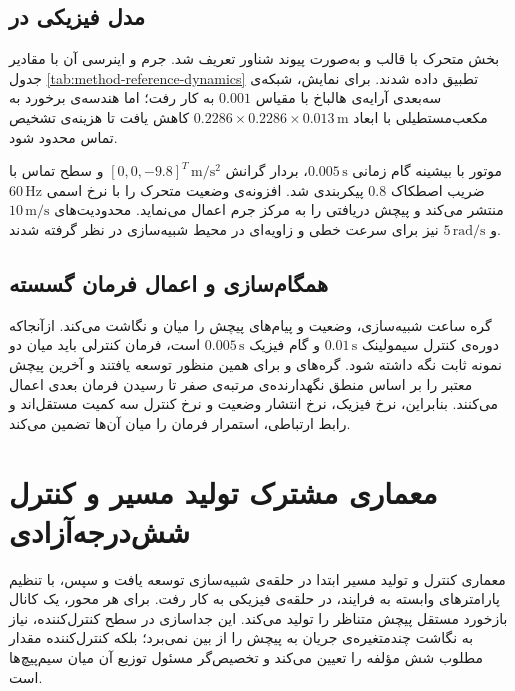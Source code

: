 \subsection{مدل فیزیکی در }
\label{subsec:method-urdf-model}

بخش متحرک با قالب  و به‌صورت پیوند شناور  تعریف شد. جرم و اینرسی آن با مقادیر جدول \ref{tab:method-reference-dynamics} تطبیق داده شدند. برای نمایش، شبکه‌ی سه‌بعدی آرایه‌ی هالباخ با مقیاس $0.001$ به کار رفت؛ اما هندسه‌ی برخورد به مکعب‌مستطیلی با ابعاد $0.2286\times0.2286\times0.013\,\mathrm m$ کاهش یافت تا هزینه‌ی تشخیص تماس محدود شود.

موتور  با بیشینه گام زمانی $0.005\,\mathrm s$، بردار گرانش $[0,0,-9.8]^T\,\mathrm{m/s^2}$ و سطح تماس با ضریب اصطکاک $0.8$ پیکربندی شد. افزونه‌ی  وضعیت متحرک را با نرخ اسمی $60\,\mathrm{Hz}$ منتشر می‌کند و  پیچش دریافتی را به مرکز جرم اعمال می‌نماید. محدودیت‌های $10\,\mathrm{m/s}$ و $5\,\mathrm{rad/s}$ نیز برای سرعت خطی و زاویه‌ای در محیط شبیه‌سازی در نظر گرفته شدند.

\subsection{همگام‌سازی و اعمال فرمان گسسته}
\label{subsec:method-ros-integration}

گره  ساعت شبیه‌سازی، وضعیت و پیام‌های پیچش را میان  و  نگاشت می‌کند. ازآنجاکه دوره‌ی کنترل سیمولینک $0.01\,\mathrm s$ و گام فیزیک $0.005\,\mathrm s$ است، فرمان کنترلی باید میان دو نمونه ثابت نگه داشته شود. گره‌های  و  برای همین منظور توسعه یافتند و آخرین پیچش معتبر را بر اساس منطق نگهدارنده‌ی مرتبه‌ی صفر تا رسیدن فرمان بعدی اعمال می‌کنند. بنابراین، نرخ فیزیک، نرخ انتشار وضعیت و نرخ کنترل سه کمیت مستقل‌اند و رابط ارتباطی، استمرار فرمان را میان آن‌ها تضمین می‌کند.

\section{معماری مشترک تولید مسیر و کنترل شش‌درجه‌آزادی}
\label{sec:method-control-design}

معماری کنترل و تولید مسیر ابتدا در حلقه‌ی شبیه‌سازی توسعه یافت و سپس، با تنظیم پارامترهای وابسته به فرایند، در حلقه‌ی فیزیکی به کار رفت. برای هر محور، یک کانال بازخورد مستقل پیچش متناظر را تولید می‌کند. این جداسازی در سطح کنترل‌کننده، نیاز به نگاشت چندمتغیره‌ی جریان به پیچش را از بین نمی‌برد؛ بلکه کنترل‌کننده مقدار مطلوب شش مؤلفه را تعیین می‌کند و تخصیص‌گر مسئول توزیع آن میان سیم‌پیچ‌ها است.

